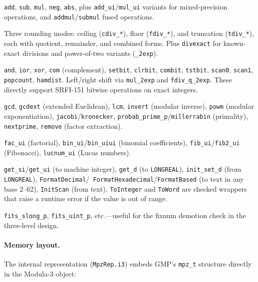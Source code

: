 \documentclass[12pt]{report}
\begin{document}
\begin{description}[style=nextline,leftmargin=1.5em]
\item[Arithmetic.]
  {\tt add}, {\tt sub}, {\tt mul}, {\tt neg}, {\tt abs},
  plus {\tt add\_ui}/{\tt mul\_ui} variants for mixed-precision
  operations, and {\tt addmul}/{\tt submul} fused operations.

\item[Division.]
  Three rounding modes: ceiling ({\tt cdiv\_*}), floor ({\tt fdiv\_*}),
  and truncation ({\tt tdiv\_*}), each with quotient, remainder, and
  combined forms.  Plus {\tt divexact} for known-exact divisions
  and power-of-two variants ({\tt *\_2exp}).

\item[Bitwise.]
  {\tt and}, {\tt ior}, {\tt xor}, {\tt com} (complement),
  {\tt setbit}, {\tt clrbit}, {\tt combit}, {\tt tstbit},
  {\tt scan0}, {\tt scan1}, {\tt popcount}, {\tt hamdist}.
  Left/right shift via {\tt mul\_2exp} and {\tt fdiv\_q\_2exp}.
  These directly support SRFI-151 bitwise operations on exact
  integers.

\item[Number theory.]
  {\tt gcd}, {\tt gcdext} (extended Euclidean), {\tt lcm},
  {\tt invert} (modular inverse), {\tt powm} (modular
  exponentiation), {\tt jacobi}/{\tt kronecker},
  {\tt probab\_prime\_p}/{\tt millerrabin} (primality),
  {\tt nextprime}, {\tt remove} (factor extraction).

\item[Combinatorial.]
  {\tt fac\_ui} (factorial), {\tt bin\_ui}/{\tt bin\_uiui}
  (binomial coefficients), {\tt fib\_ui}/{\tt fib2\_ui}
  (Fibonacci), {\tt lucnum\_ui} (Lucas numbers).

\item[Conversion.]
  {\tt get\_si}/{\tt get\_ui} (to machine integer),
  {\tt get\_d} (to {\tt LONGREAL}), {\tt init\_set\_d}
  (from {\tt LONGREAL}), {\tt FormatDecimal}/{\tt
  FormatHexadecimal}/{\tt FormatBased} (to text in any base
  2--62), {\tt InitScan} (from text).
  {\tt ToInteger} and {\tt ToWord} are checked wrappers that
  raise a runtime error if the value is out of range.

\item[Size tests.]
  {\tt fits\_slong\_p}, {\tt fits\_uint\_p}, etc.---useful for
  the fixnum demotion check in the three-level design.
\end{description}

\paragraph{Memory layout.}
The internal representation ({\tt MpzRep.i3}) embeds GMP's
{\tt mpz\_t} structure directly in the Modula-3 object:
\end{document}

